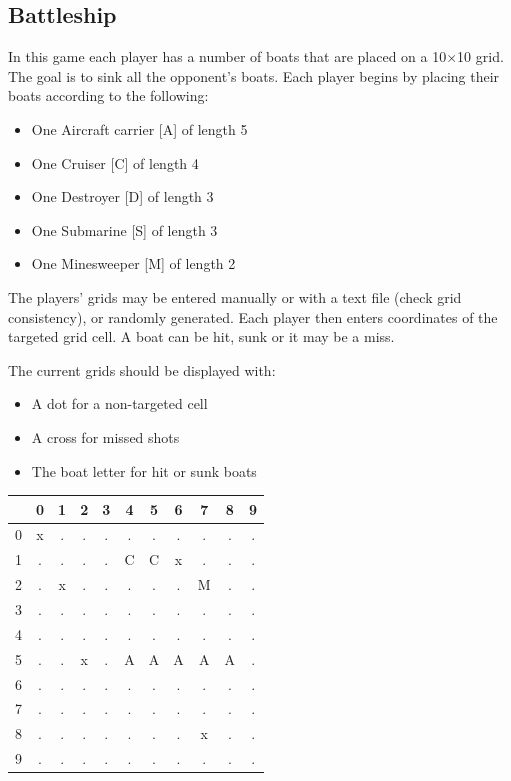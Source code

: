 \documentclass{ecnreport}
\begin{document}
\subsection{Battleship}

In this game each player has a number of boats that are placed on a 10$\times$10 grid. The goal is to sink all the opponent's boats.
Each player begins by placing their boats according to the following:
\begin{itemize}
 \item One Aircraft carrier [A] of length 5
 \item One Cruiser [C] of length 4
 \item One Destroyer [D] of length 3
 \item One Submarine [S] of length 3
 \item One Minesweeper [M] of length 2
\end{itemize}

The players' grids may be entered manually or with a text file (check grid consistency), or randomly generated.
Each player then enters coordinates of the targeted grid cell. A boat can be hit, sunk or it may be a miss. 

The current grids should be displayed with:
\begin{itemize}
 \item A dot for a non-targeted cell
 \item A cross for missed shots
 \item The boat letter for hit or sunk boats
\end{itemize}

\begin{center}
 \begin{tabular}{|c|c|c|c|c|c|c|c|c|c|c|}
 \hline 
 & 0 & 1 & 2& 3&4 &5 &6 & 7&  8&9 \\\hline
 0 &x&.&.&. &.& .&.&.&.&.\\\hline
 1 &.&.&.&. &C&C&x&.&.&.\\\hline
 2 &.&x&.&. &.&.&.&M&.&.\\\hline
 3 &.&.&.&. &.&.&.&.&.&.\\\hline
 4 &.&.&.&. &.&.&.&.&.&.\\\hline
 5 &.&.&x&. &A&A&A&A&A&.\\\hline
 6 &.&.&.&. &.&.&.&.&.&.\\\hline
 7 &.&.&.&. &.&.&.&.&.&.\\\hline
 8 &.&.&.&. &.&.&.&x&.&.\\\hline
 9 &.&.&.&. &.&.&.&.&.&.\\\hline
 \end{tabular}
\end{center}
\begin{itemize}
\end{itemize}
\end{document}
